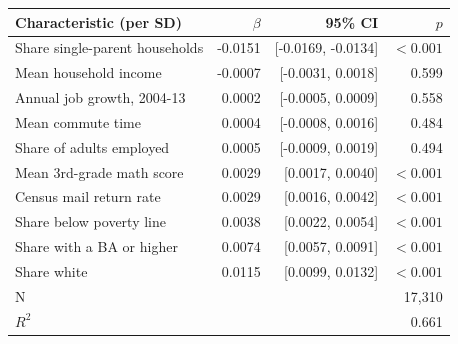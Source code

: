 \begin{tabular}{lrrr}
\toprule
Characteristic (per SD) & $\beta$ & 95\% CI & $p$ \\
\midrule
Share single-parent households & -0.0151 & [-0.0169, -0.0134] & $<0.001$ \\
Mean household income & -0.0007 & [-0.0031, 0.0018] & 0.599 \\
Annual job growth, 2004-13 & 0.0002 & [-0.0005, 0.0009] & 0.558 \\
Mean commute time & 0.0004 & [-0.0008, 0.0016] & 0.484 \\
Share of adults employed & 0.0005 & [-0.0009, 0.0019] & 0.494 \\
Mean 3rd-grade math score & 0.0029 & [0.0017, 0.0040] & $<0.001$ \\
Census mail return rate & 0.0029 & [0.0016, 0.0042] & $<0.001$ \\
Share below poverty line & 0.0038 & [0.0022, 0.0054] & $<0.001$ \\
Share with a BA or higher & 0.0074 & [0.0057, 0.0091] & $<0.001$ \\
Share white & 0.0115 & [0.0099, 0.0132] & $<0.001$ \\
\midrule
N & \multicolumn{3}{r}{17,310} \\
$R^2$ & \multicolumn{3}{r}{0.661} \\
\bottomrule
\end{tabular}
